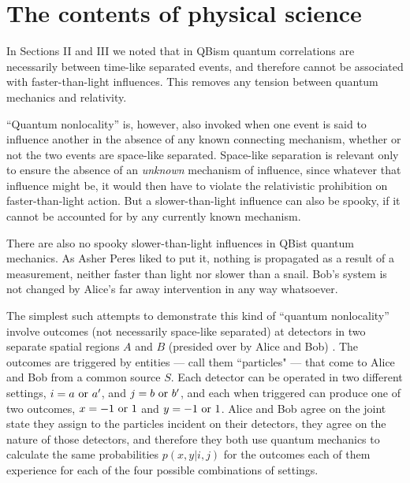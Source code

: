\documentclass[aps,prb,superscriptaddress,12pt,tightenlines,nofootinbib]{revtex4-2}
\begin{document}
\section{The contents of physical science}

In Sections II and III  we noted that in QBism quantum correlations are necessarily between time-like separated events, and therefore cannot be associated with faster-than-light influences.   This removes any tension between quantum mechanics and relativity.

 ``Quantum  nonlocality'' is, however, also invoked when one event is said to influence another  in the absence of any known connecting mechanism, whether or not the two events are space-like separated.  Space-like separation is relevant only to ensure the absence of an  {\it unknown\/} mechanism of influence, since whatever that influence might be, it would then have to violate the relativistic prohibition on faster-than-light action.  But a slower-than-light influence can also be spooky, if it cannot be accounted for by any currently known mechanism.

 There are also no spooky slower-than-light influences in QBist quantum mechanics.   As Asher Peres liked to put it, nothing is propagated as a result of a measurement, neither faster than light nor slower than a snail.  Bob's system is not changed by Alice's far away intervention in any way whatsoever.

 The  simplest such attempts to demonstrate  this kind of  ``quantum nonlocality''  involve outcomes (not necessarily space-like separated) at detectors in two separate spatial regions $A$ and $B$ (presided over by Alice and Bob) \cite{Bell2004}.  The outcomes are triggered by entities --- call them ``particles" --- that come to Alice and Bob from a common source $S$.   Each detector can be operated in two different settings, $i = a \ {\rm or}\ a'$, and   $j = b\ {\rm or}\ b'$, and each when triggered can produce one of two outcomes, $x = -1 \ {\rm or}\ 1$ and $y = -1 \ {\rm or}\ 1$.   Alice and Bob agree on the joint state they assign to the particles incident on their detectors, they agree on the nature of those detectors, and therefore they both use quantum mechanics to calculate the same probabilities $p(x,y|i,j)$ for the outcomes each of them experience for each of the four possible combinations of settings.
\end{document}
